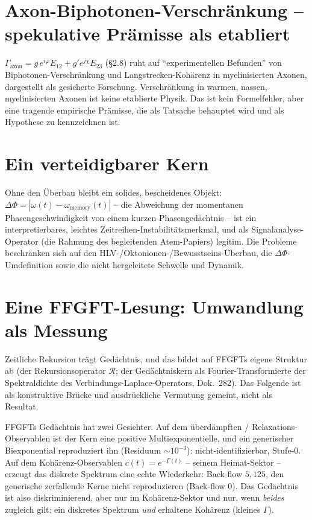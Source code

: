 \section{Axon-Biphotonen-Verschränkung -- spekulative Prämisse als etabliert}
$\Gamma_{\text{axon}}=g\,e^{i\varphi}E_{12}+g'e^{j\chi}E_{23}$ (\S2.8) ruht auf
``experimentellen Befunden'' von Biphotonen-Verschränkung und Langstrecken-Kohärenz in
myelinisierten Axonen, dargestellt als gesicherte Forschung. Verschränkung in warmen,
nassen, myelinisierten Axonen ist keine etablierte Physik. Das ist kein Formelfehler, aber
eine tragende empirische Prämisse, die als Tatsache behauptet wird und als Hypothese zu
kennzeichnen ist.

\section{Ein verteidigbarer Kern}
Ohne den Überbau bleibt ein solides, bescheidenes Objekt:
$\Delta\Phi=|\omega(t)-\omega_{\text{memory}}(t)|$ -- die Abweichung der momentanen
Phasengeschwindigkeit von einem kurzen Phasengedächtnis -- ist ein interpretierbares,
leichtes Zeitreihen-Instabilitätsmerkmal, und als Signalanalyse-Operator (die Rahmung des
begleitenden Atem-Papiers) legitim. Die Probleme beschränken sich auf den
HLV-/Oktonionen-/Bewusstseins-Überbau, die $\Delta\Phi$-Umdefinition sowie die nicht
hergeleitete Schwelle und Dynamik.

\section{Eine FFGFT-Lesung: Umwandlung als Messung}\label{sec:ffgft}
Zeitliche Rekursion trägt Gedächtnis, und das bildet auf FFGFTs eigene Struktur ab (der
Rekursionsoperator $\mathcal{R}$; der Gedächtniskern als Fourier-Transformierte der
Spektraldichte des Verbindungs-Laplace-Operators, Dok.~282). Das Folgende ist als
konstruktive Brücke und ausdrückliche Vermutung gemeint, nicht als Resultat.

FFGFTs Gedächtnis hat zwei Gesichter. Auf dem überdämpften / Relaxations-Observablen ist der
Kern eine positive Multiexponentielle, und ein generischer Biexponential reproduziert ihn
(Residuum $\sim10^{-3}$): nicht-identifizierbar, Stufe-0. Auf dem Kohärenz-Observablen
$c(t)=e^{-\Gamma(t)}$ -- seinem Heimat-Sektor -- erzeugt das diskrete Spektrum eine echte
Wiederkehr: Back-flow $5{,}125$, den generische zerfallende Kerne nicht reproduzieren
(Back-flow $0$). Das Gedächtnis ist also diskriminierend, aber nur im Kohärenz-Sektor und
nur, wenn \emph{beides} zugleich gilt: ein diskretes Spektrum \emph{und} erhaltene Kohärenz
(kleines $\Gamma$).

